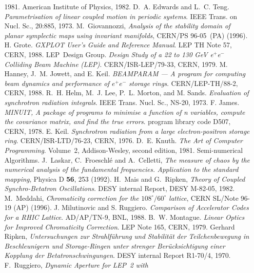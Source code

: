 \begin{thebibliography}{10}
{  1981}.
American Institute of Physics, 1982.
D.~A. Edwards and L.~C. Teng.
{\sl Parametrisation of linear coupled motion in periodic systems}.
IEEE Trans. on Nucl. Sc., 20:885, 1973.
 M.~Giovannozzi, {\sl Analysis of the stability
    domain of planar symplectic maps using invariant manifolds},
  CERN/PS 96-05~(PA) (1996).
H. Grote.
{\sl GXPLOT User's Guide and Reference Manual}.
LEP TH Note 57, CERN, 1988.
LEP~Design Group.
{\sl Design Study of a 22 to 130 GeV e\({}^{+}\)e\({}^{-}\) Colliding Beam
  Machine (LEP)}.
CERN/ISR-LEP/79-33, CERN, 1979.
M. Hanney, J.~M. Jowett, and E. Keil.
{\sl BEAMPARAM --- A program for computing beam dynamics and
  performance of $e^{+}e^{-}$ storage rings}.
CERN/LEP-TH/88-2, CERN, 1988.
R.~H. Helm, M.~J. Lee, P.~L. Morton, and M. Sands.
{\sl Evaluation of synchrotron radiation integrals}.
IEEE Trans. Nucl. Sc., NS-20, 1973.
F. James.
{\sl MINUIT, A package of programs to minimise a function of n
  variables, compute the covariance matrix, and find the true errors}.
program library code D507, CERN, 1978.
E. Keil.
{\sl Synchrotron radiation from a large electron-positron storage ring}.
CERN/ISR-LTD/76-23, CERN, 1976.
D.~E. Knuth.
{\sl The Art of Computer Programming}.
Volume~2, Addison-Wesley, second edition, 1981.
Semi-numerical Algorithms.
 J.~Laskar, C.~Froeschl\'{e} and A.~Celletti, {\sl The
    measure of chaos by the numerical analysis of the fundamental
    frequencies. Application to the standard mapping}, Physica D{\bf
    56}, 253 (1992).
H.~Mais and G.~Ripken,
{\sl Theory of Coupled Synchro-Betatron Oscillations}.
DESY internal Report, DESY M-82-05, 1982.
 M.~Meddahi, {\sl Chromaticity correction for the
    $108^{\circ}/60^{\circ}$ lattice}, CERN SL/Note 96-19 (AP) (1996).
J. Milutinovic and S. Ruggiero.
{\sl Comparison of Accelerator Codes for a RHIC Lattice}.
AD/AP/TN-9, BNL, 1988.
B.~W. Montague.
{\sl Linear Optics for Improved Chromaticity Correction}.
LEP Note 165, CERN, 1979.
Gerhard Ripken,
{\sl Untersuchungen zur Strahlf\"uhrung und Stabilit\"at der
Teilchenbewegung in Beschleunigern und Storage-Ringen unter strenger
Ber\"ucksichtigung einer Kopplung der Betatronschwingungen}.
DESY internal Report R1-70/4, 1970.
 F.~Ruggiero, {\sl Dynamic Aperture for LEP~2 with
}
\end{thebibliography}

